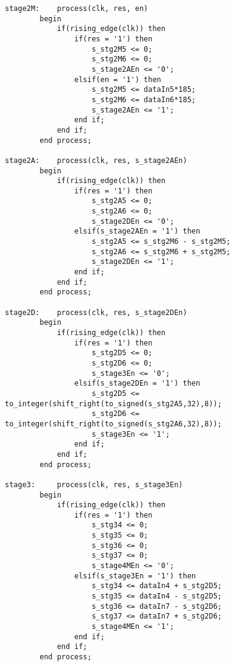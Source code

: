\begin{appendices}
\begin{lstlisting}[style=vhdl]
stage2M:    process(clk, res, en)
        begin
            if(rising_edge(clk)) then
                if(res = '1') then
                    s_stg2M5 <= 0;
                    s_stg2M6 <= 0;
                    s_stage2AEn <= '0';
                elsif(en = '1') then
                    s_stg2M5 <= dataIn5*185;
                    s_stg2M6 <= dataIn6*185;
                    s_stage2AEn <= '1';
                end if;
            end if;
        end process;

stage2A:    process(clk, res, s_stage2AEn)
        begin
            if(rising_edge(clk)) then
                if(res = '1') then
                    s_stg2A5 <= 0;
                    s_stg2A6 <= 0;
                    s_stage2DEn <= '0';
                elsif(s_stage2AEn = '1') then
                    s_stg2A5 <= s_stg2M6 - s_stg2M5;
                    s_stg2A6 <= s_stg2M6 + s_stg2M5;
                    s_stage2DEn <= '1';
                end if;
            end if;
        end process;

stage2D:    process(clk, res, s_stage2DEn)
        begin
            if(rising_edge(clk)) then
                if(res = '1') then
                    s_stg2D5 <= 0;
                    s_stg2D6 <= 0;
                    s_stage3En <= '0';
                elsif(s_stage2DEn = '1') then
                    s_stg2D5 <= to_integer(shift_right(to_signed(s_stg2A5,32),8));
                    s_stg2D6 <= to_integer(shift_right(to_signed(s_stg2A6,32),8));
                    s_stage3En <= '1';
                end if;
            end if;
        end process;                

stage3:     process(clk, res, s_stage3En)
        begin
            if(rising_edge(clk)) then
                if(res = '1') then
                    s_stg34 <= 0;
                    s_stg35 <= 0;
                    s_stg36 <= 0;
                    s_stg37 <= 0;
                    s_stage4MEn <= '0';
                elsif(s_stage3En = '1') then
                    s_stg34 <= dataIn4 + s_stg2D5;
                    s_stg35 <= dataIn4 - s_stg2D5;
                    s_stg36 <= dataIn7 - s_stg2D6;
                    s_stg37 <= dataIn7 + s_stg2D6;
                    s_stage4MEn <= '1';
                end if;
            end if;
        end process;


\end{lstlisting}
\end{appendices}

